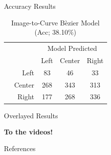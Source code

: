 \documentclass[aspectratio=169,xcolor=dvipsnames]{beamer}
\begin{document}
\begin{frame}{Accuracy Results}
\begin{multicols}{2}
    \begin{table}[h]
        \centering
            \caption{Image-to-Curve B\`ezier Model (Acc; 38.10\%) }
            \begin{tabular}{|c|r|c|c|c|}
            \multicolumn{2}{c}{} & \multicolumn{3}{c}{Model Predicted}\\\cline{3-5}
            \multicolumn{1}{c}{} & & Left & Center & Right\\\hline
             \parbox[t]{2mm}{} & Left & 83 & 46 & 33 \\
            & Center & 268 & 343 & 313 \\
            & Right & 177 & 268 & 336 \\\hline
            \end{tabular}
        \label{tab:i2bc-acc}
    \end{table}
    
    \end{multicols}
\end{frame}

\begin{frame}{Overlayed Results}

    {\vfill {\hfill \Large\bfseries To the videos! \hfill} \vfill}
    
\end{frame}

\begin{frame}[allowframebreaks]{References}
    
      
\end{frame}
\end{document}

